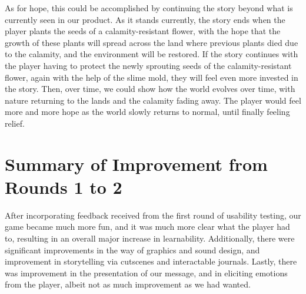 \documentclass[12pt, titlepage]{article}
\begin{document}
As for hope, this could be accomplished by continuing the story beyond what is currently seen 
in our product. As it stands currently, the story ends when the player plants the seeds of a 
calamity-resistant flower, with the hope that the growth of these plants will spread across 
the land where previous plants died due to the calamity, and the environment will be restored.
If the story continues with the player having to protect the newly sprouting 
seeds of the calamity-resistant flower, again with the help of the slime mold, they will 
feel even more invested in the story. Then, over time, we could show how the world evolves 
over time, with nature returning to the lands and the calamity fading away. The player would 
feel more and more hope as the world slowly returns to normal, until finally feeling relief.

\section{Summary of Improvement from Rounds 1 to 2}
After incorporating feedback received from the first round of usability testing, our 
game became much more fun, and it was much more clear what the player had to, resulting 
in an overall major increase in learnability. Additionally, there were significant 
improvements in the way of graphics and sound design, and improvement in storytelling 
via cutscenes and interactable journals. Lastly, there was improvement in the presentation 
of our message, and in eliciting emotions from the player, albeit not as much improvement 
as we had wanted.
\end{document}
